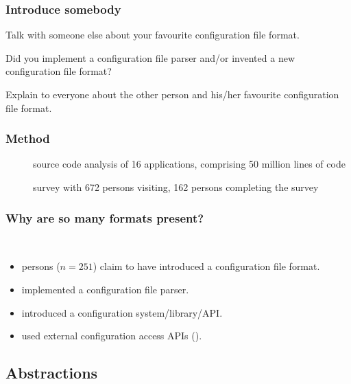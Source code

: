 \documentclass{beamer}
\begin{document}
\begin{assignment}
	\frametitle{Introduce somebody}
	\begin{task}
	Talk with someone else about your favourite configuration file format.
	\end{task}

	\begin{task}
	Did you implement a configuration file parser and/or invented a new configuration file format?
	\end{task}

	\begin{task}
	Explain to everyone about the other person and his/her favourite configuration file format.
	\end{task}
\end{assignment}

\begin{frame}
	\frametitle{Method}
	\begin{description}
	\item[\methodSource{}] source code analysis of 16 applications, comprising 50 million lines of code~\cite{raab2017challenges}
	\item[\methodQuestion{}] survey with 672 persons visiting, 162 persons completing the survey~\cite{raab2017challenges}
	\end{description}
\end{frame}

\begin{frame}
	\frametitle{Why are so many formats present?}
	\methodQuestion{} ~\cite{raab2017challenges}
	\begin{itemize}
	\item {} persons ($n=251$) claim to have introduced a configuration file format.
	\item {} implemented a configuration file parser.
	\item {} introduced a configuration system/library/API.
	\item used external configuration access APIs ().
	\end{itemize}
\end{frame}



\subsection{Abstractions}
\end{document}
